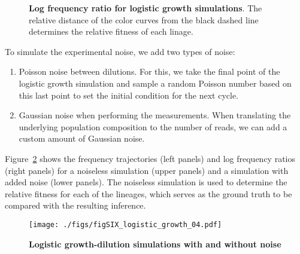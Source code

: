 \documentclass[
  letterpaper,
  DIV=11,
  numbers=noendperiod]{scrartcl}
\providecommand{\tightlist}{%
  \setlength{\itemsep}{0pt}\setlength{\parskip}{0pt}}\usepackage{longtable,booktabs,array}
\begin{document}
\begin{refsegment}
\begin{figure}
{}

\caption{\label{fig-SIX_logistic_growth_03}\textbf{Log frequency ratio
for logistic growth simulations}. The relative distance of the color
curves from the black dashed line determines the relative fitness of
each linage.}

\end{figure}

To simulate the experimental noise, we add two types of noise:

\begin{enumerate}
\def\labelenumi{\arabic{enumi}.}
\tightlist
\item
  Poisson noise between dilutions. For this, we take the final point of
  the logistic growth simulation and sample a random Poisson number
  based on this last point to set the initial condition for the next
  cycle.
\item
  Gaussian noise when performing the measurements. When translating the
  underlying population composition to the number of reads, we can add a
  custom amount of Gaussian noise.
\end{enumerate}

Figure~\ref{fig-SIX_logistic_growth_04} shows the frequency trajectories
(left panels) and log frequency ratios (right panels) for a noiseless
simulation (upper panels) and a simulation with added noise (lower
panels). The noiseless simulation is used to determine the relative
fitness for each of the lineages, which serves as the ground truth to be
compared with the resulting inference.

\begin{figure}

{\centering \texttt{[image: ./figs/figSIX\_logistic\_growth\_04.pdf]}

}

\caption{\label{fig-SIX_logistic_growth_04}\textbf{Logistic
growth-dilution simulations with and without noise}}

\end{figure}


\printbibliography[title={Supplemental References},
segment=\therefsegment, filter=notother]
\end{refsegment}

\end{document}
